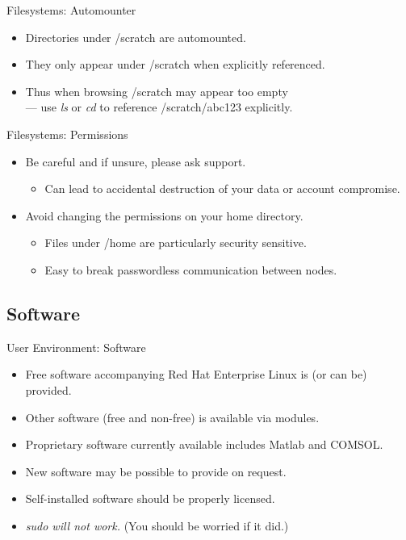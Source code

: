 \begin{frame}{Filesystems: Automounter}
\begin{itemize}
\item{Directories under /scratch are \alert{automounted}.}
\item{They only appear under /scratch when explicitly referenced.}
\item{Thus when browsing /scratch may appear too empty\hfill\\
\qquad\alert{--- use \emph{ls} or \emph{cd} to reference /scratch/abc123 explicitly.}}
\end{itemize}
\end{frame}

\begin{frame}{Filesystems: Permissions}
\begin{itemize}
\item{\color{red}Be careful and if unsure, please ask support.}
\begin{itemize}
\item{Can lead to \alert{accidental destruction} of your data or \alert{account compromise}.}
\end{itemize}
\item{Avoid changing the permissions on your home directory.}
\begin{itemize}
\item{Files under /home are particularly security sensitive.}
\item{Easy to break passwordless communication between nodes.}
\end{itemize}
\end{itemize}
\end{frame}

\subsection{Software}
\begin{frame}{User Environment: Software}
\begin{itemize}
\item{Free software accompanying \alert{Red Hat Enterprise Linux} is (or can be) provided.}
\item{Other software (free and non-free) is available via \alert{modules}.}
\item{Proprietary software currently available includes Matlab and COMSOL.}
\item{New software may be possible to provide on request.}
\item{\alert{Self-installed software should be properly licensed.}}
  \pause
\item{\color{red}\emph{sudo will not work.}\/ (You should be worried if it did.)}
\end{itemize}
\end{frame}

